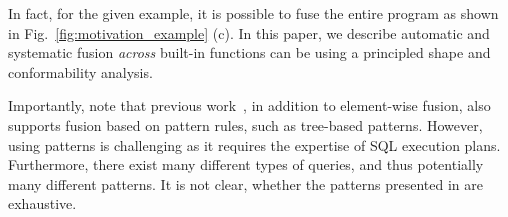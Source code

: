 In fact, for the given example, it is possible to fuse the entire program
as shown in Fig.~\ref{fig:motivation_example} (c).
In this paper, we describe automatic and systematic fusion \textit{across}
built-in functions can be using a principled shape and
conformability analysis. 

Importantly, note that previous work~\OldPaper, in addition to element-wise
fusion, also supports fusion based on pattern rules, such as tree-based patterns.
However, using patterns is challenging as it requires the expertise of
SQL execution plans. Furthermore, there exist many different types of queries,
and thus potentially many different patterns. It is not clear, whether the
patterns presented in \OldPaper are exhaustive. 


